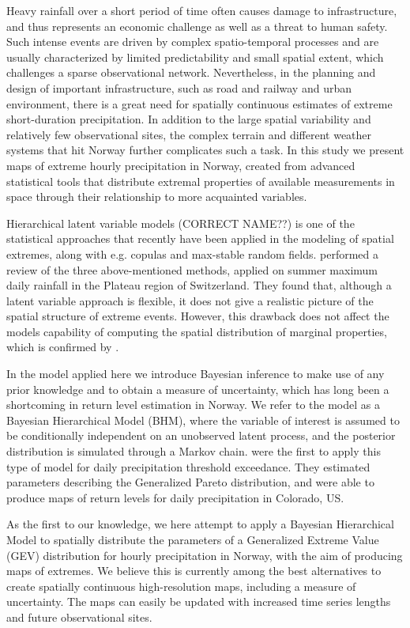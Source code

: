 \documentclass[12pt,a4paper,english]{article}
\begin{document}
Heavy rainfall over a short period of time often causes damage to infrastructure, and thus represents an economic challenge as well as a threat to human safety. Such intense events are driven by complex spatio-temporal processes and are usually characterized by limited predictability and small spatial extent, which challenges a sparse observational network. Nevertheless, in the planning and design of important infrastructure, such as road and railway and urban environment, there is a great need for spatially continuous estimates of extreme short-duration precipitation. In addition to the large spatial variability and relatively few observational sites, the complex terrain and different weather systems that hit Norway further complicates such a task. In this study we present maps of extreme hourly precipitation in Norway, created from advanced statistical tools that distribute extremal properties of available measurements in space through their relationship to more acquainted variables.

Hierarchical latent variable models (CORRECT NAME??) is one of the statistical approaches that recently have been applied in the modeling of spatial extremes, along with e.g. copulas and max-stable random fields. \cite{Davisonetal2012} performed a review of the three above-mentioned methods, applied on summer maximum daily rainfall in the Plateau region of Switzerland. They found that, although a latent variable approach is flexible, it does not give a realistic picture of the spatial structure of extreme events. However, this drawback does not affect the models capability of computing the spatial distribution of marginal properties, which is confirmed by \cite{ApputhuraiandStephenson2013}.
 
In the model applied here we introduce Bayesian inference to make use of any prior knowledge and to obtain a measure of uncertainty, which has long been a shortcoming in return level estimation in Norway. We refer to the model as a Bayesian Hierarchical Model (BHM), where the variable of interest is assumed to be conditionally independent on an unobserved latent process, and the posterior distribution is simulated through a Markov chain. \cite{Cooleyetal2007} were the first to apply this type of model for daily precipitation threshold exceedance. They estimated parameters describing the Generalized Pareto distribution, and were able to produce maps of return levels for daily precipitation in Colorado, US. 

As the first to our knowledge, we here attempt to apply a Bayesian Hierarchical Model to spatially distribute the parameters of a Generalized Extreme Value (GEV) distribution for hourly precipitation in Norway, with the aim of producing maps of extremes. We believe this is currently among the best alternatives to create spatially continuous high-resolution maps, including a measure of uncertainty. The maps can easily be updated with increased time series lengths and future observational sites. 
\end{document}
